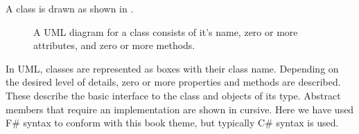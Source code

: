 \documentclass[fsharpNotes.tex]{subfiles}
\begin{document}
A class is drawn as shown in .
\begin{figure}
  \centering
  \caption{A UML diagram for a class consists of it's name, zero or more attributes, and zero or more methods.}
  \label{fig:class}
\end{figure}
In UML, classes are represented as boxes with their class name. Depending on the desired level of details, zero or more properties and methods are described. These describe the basic interface to the class and objects of its type. Abstract members that require an implementation are shown in cursive. Here we have used F\# syntax to conform with this book theme, but typically C\# syntax is used.
%

\end{document}
